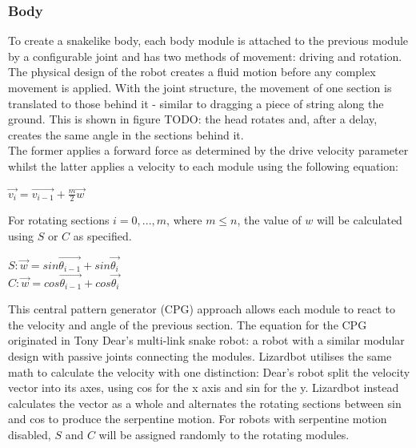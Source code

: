 \documentclass{article}
\begin{document}
\subsubsection{Body}
To create a snakelike body, each body module is attached to the previous module by a configurable joint  and has two methods of movement: driving and rotation. The physical design of the robot creates a fluid motion before any complex movement is applied. With the joint structure, the movement of one section is translated to those behind it - similar to dragging a piece of string along the ground. This is shown in figure TODO: the head rotates and, after a delay, creates the same angle in the sections behind it.\\
The former applies a forward force as determined by the drive velocity parameter whilst the latter applies a velocity to each module using the following equation:
\begin{center}
\begin{Large}
$\overrightarrow{v_{i}} = \overrightarrow{v_{i-1}} + \frac{m}{2}\overrightarrow{w} $
\end{Large}
\end{center}

For rotating sections $i = 0, ..., m$, where $m \leq n$, the value of $w$ will be calculated using $S$ or $C$ as specified.\\
\begin{center}
\begin{Large}
$S: \overrightarrow{w} = sin\overrightarrow{\theta_{i-1}} + sin\overrightarrow{\theta_{i}}$
\\[1\baselineskip]
$C: \overrightarrow{w} = cos\overrightarrow{\theta_{i-1}} + cos\overrightarrow{\theta_{i}}$\\
\end{Large}
\end{center}
This central pattern generator (CPG) approach allows each module to react to the velocity and angle of the previous section. The equation for the CPG originated in Tony Dear’s multi-link snake robot: a robot with a similar modular design with passive joints connecting the modules.  Lizardbot utilises the same math to calculate the velocity with one distinction: Dear’s robot split the velocity vector into its axes, using cos for the x axis and sin for the y. Lizardbot instead calculates the vector as a whole and alternates the rotating sections between sin and cos to produce the serpentine motion. For robots with serpentine motion disabled, $S$ and $C$ will be assigned randomly to the rotating modules.\\
\end{document}
